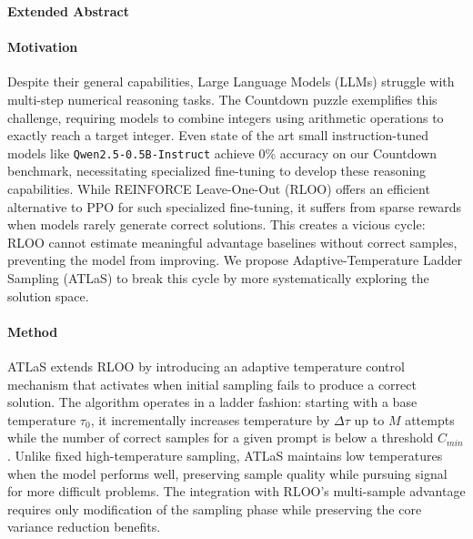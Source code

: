 \documentclass{article}
\begin{document}
\begin{titlepage}
\begin{center}
\Large\textbf{Extended Abstract}
\end{center}
\vspace{10pt}

\paragraph{Motivation} Despite their general capabilities, Large Language Models (LLMs) struggle with multi-step numerical reasoning tasks. The Countdown puzzle exemplifies this challenge, requiring models to combine integers using arithmetic operations to exactly reach a target integer. Even state of the art small instruction-tuned models like \texttt{Qwen2.5-0.5B-Instruct} achieve 0\% accuracy on our Countdown benchmark, necessitating specialized fine-tuning to develop these reasoning capabilities. While REINFORCE Leave-One-Out (RLOO) offers an efficient alternative to PPO for such specialized fine-tuning, it suffers from sparse rewards when models rarely generate correct solutions. This creates a vicious cycle: RLOO cannot estimate meaningful advantage baselines without correct samples, preventing the model from improving. We propose Adaptive-Temperature Ladder Sampling (ATLaS) to break this cycle by more systematically exploring the solution space.

\paragraph{Method} ATLaS extends RLOO by introducing an adaptive temperature control mechanism that activates when initial sampling fails to produce a correct solution. The algorithm operates in a ladder fashion: starting with a base temperature $\tau_0$, it incrementally increases temperature by $\Delta\tau$ up to $M$ attempts while the number of correct samples for a given prompt is below a threshold $C_{min}$. Unlike fixed high-temperature sampling, ATLaS maintains low temperatures when the model performs well, preserving sample quality while pursuing signal for more difficult problems. The integration with RLOO's multi-sample advantage requires only modification of the sampling phase while preserving the core variance reduction benefits.


\end{titlepage}
\end{document}
